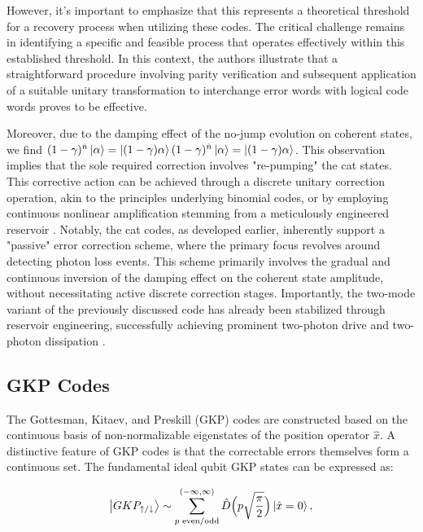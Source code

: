 \documentclass[11pt]{article}
\newcommand\0{\mathbf{0}}
\newcommand\<{\langle}
\renewcommand\>{\rangle}
\begin{document}
However, it's important to emphasize that this represents a theoretical threshold for a recovery process when utilizing these codes. The critical challenge remains in identifying a specific and feasible process that operates effectively within this established threshold. In this context, the authors illustrate that a straightforward procedure involving parity verification and subsequent application of a suitable unitary transformation to interchange error words with logical code words proves to be effective.

Moreover, due to the damping effect of the no-jump evolution on coherent states, we find $(1 - \gamma)^{\hat{n}}\ket{\alpha} = \ket{(1 - \gamma) \alpha}(1 - \gamma)^{\hat{n}}\ket{\alpha} = \ket{(1 - \gamma) \alpha}$. This observation implies that the sole required correction involves "re-pumping" the cat states. This corrective action can be achieved through a discrete unitary correction operation, akin to the principles underlying binomial codes, or by employing continuous nonlinear amplification stemming from a meticulously engineered reservoir \cite{leghtas2013hardware, mirrahimi2014dynamically}. Notably, the cat codes, as developed earlier, inherently support a "passive" error correction scheme, where the primary focus revolves around detecting photon loss events. This scheme primarily involves the gradual and continuous inversion of the damping effect on the coherent state amplitude, without necessitating active discrete correction stages. Importantly, the two-mode variant of the previously discussed code has already been stabilized through reservoir engineering, successfully achieving prominent two-photon drive and two-photon dissipation \cite{leghtas2015confining}.

\subsection{GKP Codes}

The Gottesman, Kitaev, and Preskill (GKP) codes \cite{gottesman2001encoding} are constructed based on the continuous basis of non-normalizable eigenstates of the position operator $\hat{x}$. A distinctive feature of GKP codes is that the correctable errors themselves form a continuous set. The fundamental ideal qubit GKP states can be expressed as:

\begin{align}
\label{eq:gkp}
\ket{GKP_{\uparrow/\downarrow}} \sim \sum_{p\text{ even/odd}}^{(-\infty, \infty)} \hat{D}\Big(p \sqrt{\frac{\pi}{2}} \Big) \ket{\hat{x} = 0}, 	
\end{align}
\end{document}
